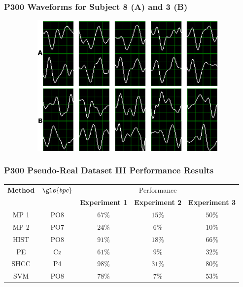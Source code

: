 \documentclass[aspectratio=169]{beamer}
\begin{document}
\begin{frame}
\frametitle{P300 Waveforms for Subject 8 (A) and 3 (B)}
\begin{center}
\begin{figure}[h!]
\centering
\includegraphics[height=7cm,width=1\textwidth]{images/subject.png}\label{subject8}
\label{fig:p300templates}
\end{figure}
\end{center}
\end{frame} 
    

\begin{frame}
\frametitle{P300 Pseudo-Real Dataset III Performance Results }    
\begin{table}[h!]
\centering
\begin{tabular}{ccccc}
\toprule
\textbf{Method}	& \textbf{$\gls{bpc}$} &   \multicolumn{3}{c}{Performance} \\
 	&  &  \textbf{Experiment 1} & \textbf{Experiment 2}	& \textbf{Experiment 3}\\
\midrule
MP 1 & PO8  & $67\%$ & $15\%$ & $50\%$\\
MP 2 & PO7 & $24\%$ & $6\%$ & $10\%$\\
HIST  & PO8 & $91\%$ & $18\%$ & $66\%$\\
PE     & Cz & $61\%$ & $9\%$ & $32\%$\\
SHCC & P4 & $98\%$ & $31\%$ & $80\%$\\
SVM     & PO8  & $78\%$ & $7\%$ & $53\%$\\
\bottomrule
\end{tabular}
\label{tab:results}
\end{table}    
\end{frame} 
\end{document}
